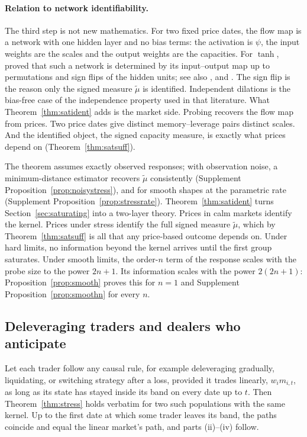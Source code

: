 \paragraph{Relation to network identifiability.} The third step is not new mathematics. For two fixed price dates, the flow map is a network with one hidden layer and no bias terms: the activation is $\psi$, the input weights are the scales and the output weights are the capacities. For $\tanh$, \citet{sussmann1992} proved that such a network is determined by its input--output map up to permutations and sign flips of the hidden units; see also \citet{albertini1993}, \citet{fefferman1994} and \citet{vlacic2019}. The sign flip is the reason only the signed measure $\tilde\mu$ is identified. Independent dilations is the bias-free case of the independence property used in that literature. What Theorem~\ref{thm:satident} adds is the market side. Probing recovers the flow map from prices. Two price dates give distinct memory--leverage pairs distinct scales. And the identified object, the signed capacity measure, is exactly what prices depend on (Theorem~\ref{thm:satsuff}).

The theorem assumes exactly observed responses; with observation noise, a minimum-distance estimator recovers $\tilde\mu$ consistently (Supplement Proposition~\ref{prop:noisystress}), and for smooth shapes at the parametric rate (Supplement Proposition~\ref{prop:stressrate}). Theorem~\ref{thm:satident} turns Section~\ref{sec:saturating} into a two-layer theory. Prices in calm markets identify the kernel. Prices under stress identify the full signed measure $\tilde\mu$, which by Theorem~\ref{thm:satsuff} is all that any price-based outcome depends on. Under hard limits, no information beyond the kernel arrives until the first group saturates. Under smooth limits, the order-$n$ term of the response scales with the probe size to the power $2n+1$. Its information scales with the power $2(2n+1)$: Proposition~\ref{prop:smooth} proves this for $n=1$ and Supplement Proposition~\ref{prop:smoothn} for every $n$.

\subsection{Deleveraging traders and dealers who anticipate}

\begin{proposition}\label{prop:delever}
Let each trader follow any causal rule, for example deleveraging gradually, liquidating, or switching strategy after a loss, provided it trades linearly, $w_im_{i,t}$, as long as its state has stayed inside its band on every date up to $t$. Then Theorem~\ref{thm:stress} holds verbatim for two such populations with the same kernel. Up to the first date at which some trader leaves its band, the paths coincide and equal the linear market's path, and parts (ii)--(iv) follow.
\end{proposition}

